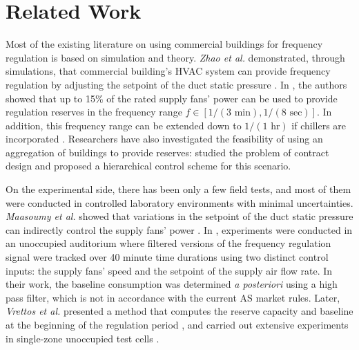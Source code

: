 \documentclass[../thesis.tex]{subfiles}
\begin{document}

\section{Related Work}
Most of the existing literature on using commercial buildings for frequency regulation is based on simulation and theory. 
\textit{Zhao et al.} demonstrated, through simulations, that commercial building's HVAC system can provide frequency regulation by adjusting the setpoint of the duct static pressure \cite{Zhao:2013hvac}.
In \cite{Hao:2014fan}, the authors showed that %
up to 15\% of the rated supply fans' power can be used to provide regulation reserves in the frequency range $f \in [1/(3 \text{~min}), 1/(8 \text{~sec})]$. 
In addition, this frequency range can be extended down to $1/(1 \text{~hr})$ if chillers are incorporated \cite{Lin:2013chiller}.
Researchers have also investigated the feasibility of using an aggregation of buildings to provide reserves: \cite{Balandat:2014contractdesign} studied the problem of contract design and \cite{Vrettos:2014aggregation} proposed a hierarchical control scheme for this scenario.

On the experimental side, there has been only a few field tests, and most of them were conducted in controlled laboratory environments with minimal uncertainties.
\textit{Maasoumy et al.} showed that variations in the setpoint of the duct static pressure can indirectly control the supply fans' power \cite{Maasoumy:2014exp}. %
In \cite{Lin:2015exp}, experiments were conducted in an unoccupied auditorium where filtered versions of the frequency regulation signal were tracked over 40 minute time durations using two distinct control inputs: the supply fans' speed and the setpoint of the supply air flow rate. 
In their work, the baseline consumption was determined \textit{a posteriori} using a high pass filter, which is not in accordance with the current AS market rules.
Later, \textit{Vrettos et al.} presented a method that computes the reserve capacity and baseline at the beginning of the regulation period \cite{Vrettos:2016flexlab1}, and carried out extensive experiments in single-zone unoccupied test cells \cite{Vrettos:2016flexlab2}.
\end{document}
